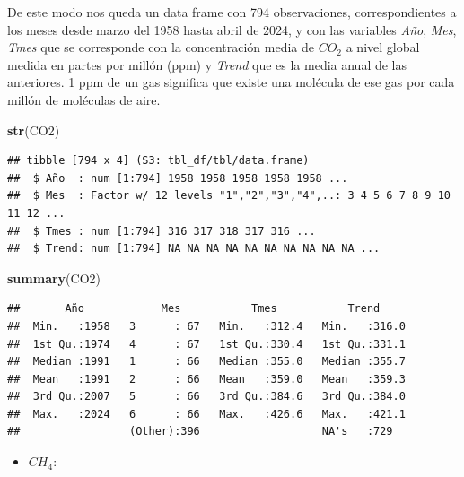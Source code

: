 \documentclass[12pt,a4paper,]{book}
\newenvironment{Shaded}{\begin{snugshade}}{\end{snugshade}}
\newcommand{\FunctionTok}[1]{\textcolor[rgb]{0.13,0.29,0.53}{\textbf{#1}}}
\newcommand{\NormalTok}[1]{#1}
\numberwithin{dummy}{section}
\theoremstyle{ocrenumbox}
\theoremstyle{blacknumex}
\theoremstyle{blacknumbox}
\theoremstyle{ocrenum}
\theoremstyle{ocrenum}
\begin{document}
De este modo nos queda un data frame con 794 observaciones,
correspondientes a los meses desde marzo del 1958 hasta abril de 2024, y
con las variables \emph{Año}, \emph{Mes}, \emph{Tmes} que se corresponde
con la concentración media de \(CO_2\) a nivel global medida en partes
por millón (ppm) y \emph{Trend} que es la media anual de las anteriores.
1 ppm de un gas significa que existe una molécula de ese gas por cada
millón de moléculas de aire.

\begin{Shaded}
\begin{Highlighting}[]
\FunctionTok{str}\NormalTok{(CO2)}
\end{Highlighting}
\end{Shaded}

\begin{verbatim}
## tibble [794 x 4] (S3: tbl_df/tbl/data.frame)
##  $ Año  : num [1:794] 1958 1958 1958 1958 1958 ...
##  $ Mes  : Factor w/ 12 levels "1","2","3","4",..: 3 4 5 6 7 8 9 10 11 12 ...
##  $ Tmes : num [1:794] 316 317 318 317 316 ...
##  $ Trend: num [1:794] NA NA NA NA NA NA NA NA NA NA ...
\end{verbatim}

\begin{Shaded}
\begin{Highlighting}[]
\FunctionTok{summary}\NormalTok{(CO2)}
\end{Highlighting}
\end{Shaded}

\begin{verbatim}
##       Año            Mes           Tmes           Trend      
##  Min.   :1958   3      : 67   Min.   :312.4   Min.   :316.0  
##  1st Qu.:1974   4      : 67   1st Qu.:330.4   1st Qu.:331.1  
##  Median :1991   1      : 66   Median :355.0   Median :355.7  
##  Mean   :1991   2      : 66   Mean   :359.0   Mean   :359.3  
##  3rd Qu.:2007   5      : 66   3rd Qu.:384.6   3rd Qu.:384.0  
##  Max.   :2024   6      : 66   Max.   :426.6   Max.   :421.1  
##                 (Other):396                   NA's   :729
\end{verbatim}

\begin{itemize}
\item $CH_4$:
\end{itemize}
\end{document}

